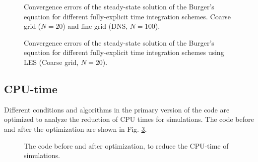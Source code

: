 \documentclass[a4paper]{article}
\begin{document}
\begin{figure}[H]
	\centering
	\begin{minipage}[b]{0.52\textwidth}
	\end{minipage}%
	\begin{minipage}[b]{0.52\textwidth}
	\end{minipage}
	\caption{Convergence errors of the steady-state solution of the Burger's equation for different fully-explicit time integration schemes. Coarse grid ($ N=20 $) and fine grid (DNS, $ N=100 $).}
	\label{fig:error}
\end{figure}

\begin{figure}[H]
	\centering
	\begin{minipage}[b]{0.52\textwidth}
	\end{minipage}%
	\begin{minipage}[b]{0.52\textwidth}
	\end{minipage}
	\caption{Convergence errors of the steady-state solution of the Burger's equation for different fully-explicit time integration schemes using LES (Coarse grid, $ N=20 $).}
	\label{fig:error2}
\end{figure}

\subsection{CPU-time}
Different conditions and algorithms in the primary version of the code are optimized to analyze the reduction of CPU times for simulations. The code before and after the optimization are shown in Fig. \ref{fig:CPU-time}.
\begin{figure}[H]
	\centering
	\begin{minipage}[b]{0.5\textwidth}
	\end{minipage}%
	\begin{minipage}[b]{0.5\textwidth}
	\end{minipage}
	\caption{The code before and after optimization, to reduce the CPU-time of simulations.}
	\label{fig:CPU-time}
\end{figure}
\end{document}
